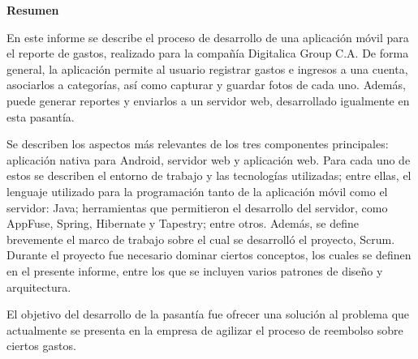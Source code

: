 \setcounter{page}{3}
\begin{center}
	{\bf Resumen}  %
\end{center}	

En este informe se describe el proceso de desarrollo de una aplicación móvil para el reporte de gastos, realizado para la compañía Digitalica Group C.A. De forma general, la aplicación permite al usuario registrar gastos e ingresos a una cuenta, asociarlos a categorías, así como capturar y guardar fotos de cada uno. Además, puede generar reportes y enviarlos a un servidor web, desarrollado igualmente en esta pasantía. 

Se describen los aspectos más relevantes de los tres componentes principales: aplicación nativa para Android, servidor web y aplicación web. Para cada uno de estos se describen el entorno de trabajo y las tecnologías utilizadas; entre ellas, el lenguaje utilizado para la programación tanto de la aplicación móvil como el servidor: Java; herramientas que permitieron el desarrollo del servidor, como AppFuse, Spring, Hibernate y Tapestry; entre otros. Además, se define brevemente el marco de trabajo sobre el cual se desarrolló el proyecto, Scrum. Durante el proyecto fue necesario dominar ciertos conceptos, los cuales se definen en el presente informe,  entre los que se incluyen varios patrones de diseño y arquitectura.

El objetivo del desarrollo de la pasantía fue ofrecer una solución al problema que actualmente se presenta en la empresa de agilizar el proceso de reembolso sobre ciertos gastos.


